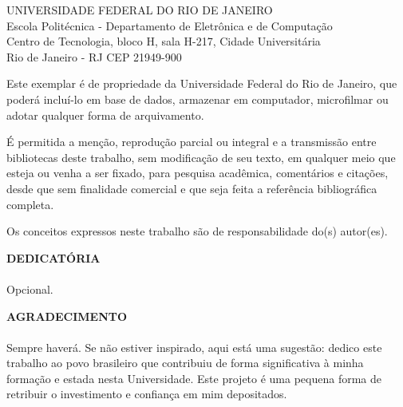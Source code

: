 \pagebreak

\vspace{0.5cm}

UNIVERSIDADE FEDERAL DO RIO DE JANEIRO \\
Escola Politécnica - Departamento de Eletrônica e de Computação \\
Centro de Tecnologia, bloco H, sala H-217, Cidade Universitária \\
Rio de Janeiro - RJ      CEP 21949-900\\
\vspace{0.5cm}

Este exemplar é de propriedade da Universidade Federal do Rio de Janeiro, que poderá incluí-lo em base de dados, armazenar em computador, microfilmar ou adotar qualquer forma de arquivamento.

É permitida a menção, reprodução parcial ou integral e a transmissão entre bibliotecas deste trabalho, sem modificação de seu texto, em qualquer meio que esteja ou venha a ser fixado, para pesquisa acadêmica, comentários e citações, desde que sem finalidade comercial e que seja feita a referência bibliográfica completa.

Os conceitos expressos neste trabalho são de responsabilidade do(s) autor(es).

\pagebreak

\begin{center}
\textbf{DEDICATÓRIA}
\end{center}
\vspace{0.5cm}

\paragraph{}Opcional.

\pagebreak


\begin{center}
\textbf{AGRADECIMENTO}
\end{center}
\vspace{0.5cm}

\paragraph{}Sempre haverá. Se não estiver inspirado, aqui está uma sugestão: dedico este trabalho ao povo brasileiro que contribuiu de forma significativa à minha formação e estada nesta Universidade. Este projeto é uma pequena forma de retribuir o investimento e confiança em mim depositados.

